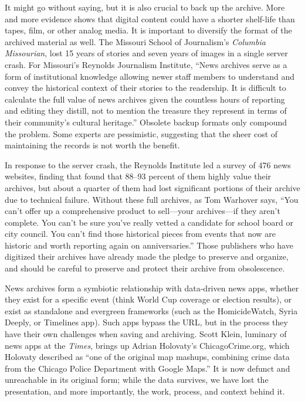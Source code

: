 It might go without saying, but it is also crucial to back up the archive. More and more evidence shows that digital content could have a shorter shelf-life than tapes, film, or other analog media.\autocite{sample_google_2015} It is important to diversify the format of the archived material as well. The Missouri School of Journalism's \emph{Columbia Missourian}, lost 15 years of stories and seven years of images in a single server crash.\autocite{sillesen_minus_2014} For Missouri's Reynolds Journalism Institute, ``News archives serve as a form of institutional knowledge allowing newer staff members to understand and convey the historical context of their stories to the readership. It is difficult to calculate the full value of news archives given the countless hours of reporting and editing they distill, not to mention the treasure they represent in terms of their community's cultural heritage.''\autocite{mccain_saving_2014} Obsolete backup formats only compound the problem. Some experts are pessimistic, suggesting that the sheer cost of maintaining the records is not worth the benefit.

In response to the server crash, the Reynolds Institute led a survey of 476 news websites, finding that found that 88--93 percent of them highly value their archives, but about a quarter of them had lost significant portions of their archive due to technical failure. Without these full archives, as Tom Warhover says, ``You can't offer up a comprehensive product to sell---your archives---if they aren't complete. You can't be sure you've really vetted a candidate for school board or city council. You can't find those historical pieces from events that now are historic and worth reporting again on anniversaries.''\autocite{mccain_saving_2014} Those publishers who have digitized their archives have already made the pledge to preserve and organize, and should be careful to preserve and protect their archive from obsolescence.

News archives form a symbiotic relationship with data-driven news apps, whether they exist for a specific event (think World Cup coverage or election results), or exist as standalone and evergreen frameworks (such as the HomicideWatch, Syria Deeply, or Timelines app). Such apps bypass the URL, but in the process they have their own challenges when saving and archiving. Scott Klein, luminary of news apps at the \emph{Times}, brings up Adrian Holovaty's ChicagoCrime.org, which Holovaty described as ``one of the original map mashups, combining crime data from the Chicago Police Department with Google Maps.''\autocite{holovaty_memory_2008} It is now defunct and unreachable in its original form; while the data survives, we have lost the presentation, and more importantly, the work, process, and context behind it.

